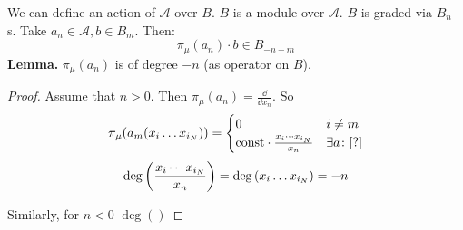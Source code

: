 \documentclass[]{../../../../tex/classes/styledArticle}
\newcommand\asc{\mathscr{A}}
\begin{document}
	
	We can define an action of $\asc$ over $B$. $B$ is a module over $\asc$. $B$ is graded via $B_n$-s. Take $a_n \in \asc, b \in B_m$. Then: 
	\[ \pi_\mu(a_n)\cdot b \in B_{-n + m} \]
	\textbf{Lemma. }$\pi_\mu(a_n)$ is of degree $-n$ (as operator on $B$). \begin{proof}
		Assume that $n > 0$. Then $\pi_\mu(a_n) = \frac{\dd}{\dd x_n}$. So
		\[ \pi_\mu(a_m(x_i \dots x_{i_N})) = \begin{cases}
			0 & i \neq m \\
			\text{const} \cdot \frac{x_i \cdots x_{i_N}}{x_n} & \exists a\colon [?]
		\end{cases} \]
		\[ \deg\left ( \frac{x_i \cdots x_{i_N}}{x_n} \right ) = \deg\left ( x_{i} \dots x_{i_N} \right ) = -n \]
		
		Similarly, for $n < 0$ $\deg()$
	\end{proof}
	
	
	
	
\end{document}
